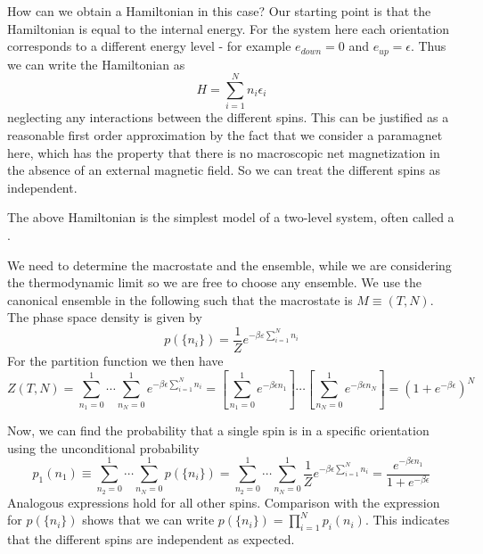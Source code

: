 \documentclass[12pt, a4paper, oneside, openright, titlepage]{book}
\begin{document}
How can we obtain a Hamiltonian in this case? Our starting point is that the Hamiltonian is equal to the internal energy. For the system here each orientation corresponds to a different energy level - for example $e_{down} = 0$ and $e_{up} = \epsilon$. Thus we can write the Hamiltonian as \begin{equation*}
    H = \sum_{i=1}^Nn_i\epsilon_i
\end{equation*}
neglecting any interactions between the different spins. This can be justified as a reasonable first order approximation by the fact that we consider a paramagnet here, which has the property that there is no macroscopic net magnetization in the absence of an external magnetic field. So we can treat the different spins as independent.

The above Hamiltonian is the simplest model of a two-level system, often called a .

We need to determine the macrostate and the ensemble, while we are considering the thermodynamic limit so we are free to choose any ensemble. We use the canonical ensemble in the following such that the macrostate is $M \equiv (T,N)$. The phase space density is given by \begin{equation*}
    p(\{n_i\}) = \frac{1}{Z}e^{-\beta\varepsilon \sum_{i=1}^Nn_i}
\end{equation*}
For the partition function we then have \begin{equation*}
    Z(T,N) = \sum_{n_1=0}^1\cdots \sum_{n_N=0}^1e^{-\beta \epsilon\sum_{i=1}^Nn_i} = \left[\sum_{n_1=0}^1e^{-\beta \epsilon n_1}\right]\cdots \left[\sum_{n_N=0}^1e^{-\beta \epsilon n_N}\right] = (1+e^{-\beta \epsilon})^N
\end{equation*}

Now, we can find the probability that a single spin is in a specific orientation using the unconditional probability \begin{equation*}
    p_1(n_1) \equiv \sum_{n_2=0}^1\cdots \sum_{n_N=0}^1p(\{n_i\}) = \sum_{n_2=0}^1\cdots \sum_{n_N=0}^1\frac{1}{Z}e^{-\beta \epsilon\sum_{i=1}^Nn_i} = \frac{e^{-\beta \epsilon n_1}}{1+e^{-\beta \epsilon}}
\end{equation*}
Analogous expressions hold for all other spins. Comparison with the expression for $p(\{n_i\})$ shows that we can write $p(\{n_i\}) = \prod_{i=1}^Np_i(n_i)$. This indicates that the different spins are independent as expected.
\end{document}
